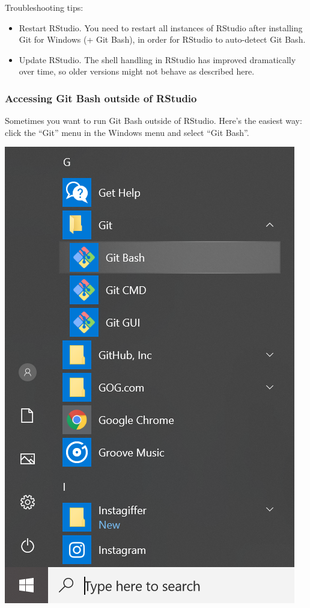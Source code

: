 \documentclass[
]{book}
\providecommand{\tightlist}{%
  \setlength{\itemsep}{0pt}\setlength{\parskip}{0pt}}
\begin{document}
Troubleshooting tips:

\begin{itemize}
\tightlist
\item
  Restart RStudio. You need to restart all instances of RStudio after installing Git for Windows (+ Git Bash), in order for RStudio to auto-detect Git Bash.
\item
  Update RStudio. The shell handling in RStudio has improved dramatically over time, so older versions might not behave as described here.
\end{itemize}

\subsubsection{Accessing Git Bash outside of RStudio}\label{accessing-git-bash-outside-of-rstudio}

Sometimes you want to run Git Bash outside of RStudio. Here's the easiest way: click the ``Git'' menu in the Windows menu and select ``Git Bash''.

\includegraphics{img/2019-01_git_bash_windows.png}
\end{document}

